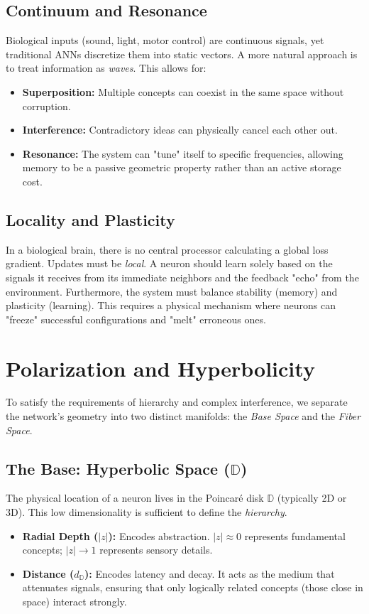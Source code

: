 \documentclass{article}
\begin{document}
\subsection{Continuum and Resonance}
Biological inputs (sound, light, motor control) are continuous signals, yet traditional ANNs discretize them into static vectors. A more natural approach is to treat information as \textit{waves}. This allows for:
\begin{itemize}
    \item \textbf{Superposition:} Multiple concepts can coexist in the same space without corruption.
    \item \textbf{Interference:} Contradictory ideas can physically cancel each other out.
    \item \textbf{Resonance:} The system can "tune" itself to specific frequencies, allowing memory to be a passive geometric property rather than an active storage cost.
\end{itemize}

\subsection{Locality and Plasticity}
In a biological brain, there is no central processor calculating a global loss gradient. Updates must be \textit{local}. A neuron should learn solely based on the signals it receives from its immediate neighbors and the feedback "echo" from the environment. Furthermore, the system must balance stability (memory) and plasticity (learning). This requires a physical mechanism where neurons can "freeze" successful configurations and "melt" erroneous ones.

\section{Polarization and Hyperbolicity}
To satisfy the requirements of hierarchy and complex interference, we separate the network's geometry into two distinct manifolds: the \textit{Base Space} and the \textit{Fiber Space}.

\subsection{The Base: Hyperbolic Space ($\mathbb{D}$)}
The physical location of a neuron lives in the Poincaré disk $\mathbb{D}$ (typically 2D or 3D). This low dimensionality is sufficient to define the \textit{hierarchy}.
\begin{itemize}
    \item \textbf{Radial Depth ($|z|$):} Encodes abstraction. $|z| \approx 0$ represents fundamental concepts; $|z| \to 1$ represents sensory details.
    \item \textbf{Distance ($d_{\mathbb{D}}$):} Encodes latency and decay. It acts as the medium that attenuates signals, ensuring that only logically related concepts (those close in space) interact strongly.
\end{itemize}
\end{document}
